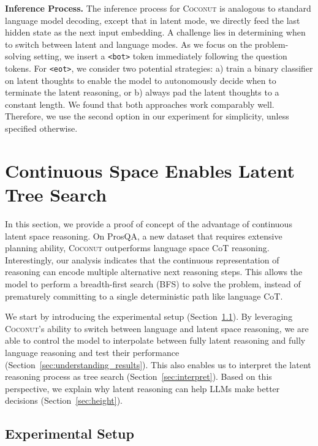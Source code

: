 \documentclass[]{fairmeta}
\newcommand{\ours}{\textsc{Coconut}\xspace}
\begin{document}
\noindent\textbf{Inference Process.} The inference process for \ours is analogous to standard language model decoding, except that in latent mode, we directly feed the last hidden state as the next input embedding. A challenge lies in determining when to switch between latent and language modes. As we focus on the problem-solving setting, we insert a \texttt{<bot>} token immediately following the question tokens. For \texttt{<eot>}, we consider two potential strategies: a) train a binary classifier on latent thoughts to enable the model to autonomously decide when to terminate the latent reasoning, or b) always pad the latent thoughts to a constant length. We found that both approaches work comparably well. Therefore, we use the second option in our experiment for simplicity, unless specified otherwise.

\section{Continuous Space Enables Latent Tree Search}

\label{sec:understanding}

In this section, we provide a proof of concept of the advantage of continuous latent space reasoning. On ProsQA, a new dataset that requires extensive planning ability, \ours outperforms language space CoT reasoning. Interestingly, our analysis indicates that the continuous representation of reasoning can encode multiple alternative next reasoning steps. This allows the model to perform a breadth-first search (BFS) to solve the problem, instead of prematurely committing to a single deterministic path like language CoT.

We start by introducing the experimental setup (Section~\ref{sec:search_setup}). By leveraging \ours 's ability to switch between language and latent space reasoning, we are able to control the model to interpolate between fully latent reasoning and fully language reasoning and test their performance (Section~\ref{sec:understanding_results}). This also enables us to interpret the latent reasoning process as tree search (Section~\ref{sec:interpret}). Based on this perspective, we explain why latent reasoning can help LLMs make better decisions (Section~\ref{sec:height}).

\subsection{Experimental Setup}

\label{sec:search_setup}
\end{document}
